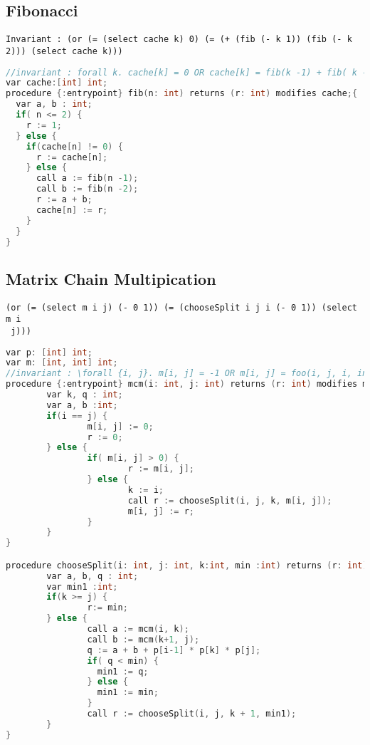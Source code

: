 \subsection{Fibonacci}
\begin{verbatim}
Invariant : (or (= (select cache k) 0) (= (+ (fib (- k 1)) (fib (- k 2))) (select cache k)))
\end{verbatim}
\begin{lstlisting}[language=c, caption= {Procedure `fib' :
      returns the n'th fibonacci number}, label=lst:factorialSimple]
//invariant : forall k. cache[k] = 0 OR cache[k] = fib(k -1) + fib( k -2)
var cache:[int] int;
procedure {:entrypoint} fib(n: int) returns (r: int) modifies cache;{
  var a, b : int;
  if( n <= 2) {
    r := 1;
  } else {
    if(cache[n] != 0) {
      r := cache[n];
    } else {
      call a := fib(n -1);
      call b := fib(n -2);
      r := a + b;
      cache[n] := r;
    }
  }
}
\end{lstlisting}

\subsection{Matrix Chain Multipication}
\begin{verbatim}
(or (= (select m i j) (- 0 1)) (= (chooseSplit i j i (- 0 1)) (select m i
 j)))
\end{verbatim}

\begin{lstlisting}[language=c, caption= {Procedure `matrix chain multipication' :
      returns the minimum number of multipications needed to multiply a sequence of matrices.}, label=lst:factorialRecent]
var p: [int] int;
var m: [int, int] int;
//invariant : \forall {i, j}. m[i, j] = -1 OR m[i, j] = foo(i, j, i, infinity)
procedure {:entrypoint} mcm(i: int, j: int) returns (r: int) modifies m;{
        var k, q : int;
        var a, b :int;
        if(i == j) {
                m[i, j] := 0;
                r := 0;
        } else {
                if( m[i, j] > 0) {
                        r := m[i, j];
                } else {
                        k := i;
                        call r := chooseSplit(i, j, k, m[i, j]);
                        m[i, j] := r;
                }
        }
}

procedure chooseSplit(i: int, j: int, k:int, min :int) returns (r: int) modifies m;{
        var a, b, q : int;
        var min1 :int;
        if(k >= j) {
                r:= min;
        } else {        
                call a := mcm(i, k);
                call b := mcm(k+1, j);
                q := a + b + p[i-1] * p[k] * p[j];
                if( q < min) {
                  min1 := q;
                } else {
                  min1 := min;
                }
                call r := chooseSplit(i, j, k + 1, min1);
        }       
}
\end{lstlisting}
